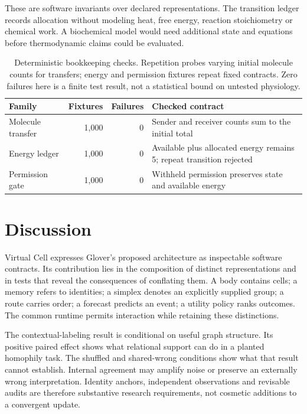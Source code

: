 \documentclass[10pt,a4paper]{article}
\begin{document}
These are software invariants over declared representations. The transition ledger records allocation without modeling heat, free energy, reaction stoichiometry or chemical work. A biochemical model would need additional state and equations before thermodynamic claims could be evaluated.

\begin{table}[htbp]\centering\small
\caption{Deterministic bookkeeping checks. Repetition probes varying initial molecule counts for transfers; energy and permission fixtures repeat fixed contracts. Zero failures here is a finite test result, not a statistical bound on untested physiology.}\label{tab:invariants}
\begin{tabular}{lrrp{.42\linewidth}}\toprule
Family & Fixtures & Failures & Checked contract \\\midrule
Molecule transfer & 1,000 & 0 & Sender and receiver counts sum to the initial total \\
Energy ledger & 1,000 & 0 & Available plus allocated energy remains 5; repeat transition rejected \\
Permission gate & 1,000 & 0 & Withheld permission preserves state and available energy \\\bottomrule
\end{tabular}\end{table}

\section*{Discussion}
Virtual Cell expresses Glover's proposed architecture as inspectable software contracts. Its contribution lies in the composition of distinct representations and in tests that reveal the consequences of conflating them. A body contains cells; a memory refers to identities; a simplex denotes an explicitly supplied group; a route carries order; a forecast predicts an event; a utility policy ranks outcomes. The common runtime permits interaction while retaining these distinctions.

The contextual-labeling result is conditional on useful graph structure. Its positive paired effect shows what relational support can do in a planted homophily task. The shuffled and shared-wrong conditions show what that result cannot establish. Internal agreement may amplify noise or preserve an externally wrong interpretation. Identity anchors, independent observations and revisable audits are therefore substantive research requirements, not cosmetic additions to a convergent update.
\end{document}
